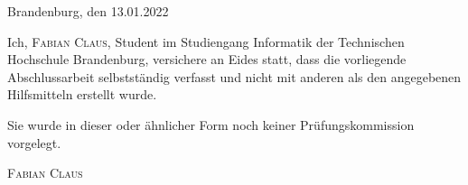 \thispagestyle{empty}

\large
\begin{flushright}
  Brandenburg, den 13.01.2022
\end{flushright}

\vspace*{50mm}
Ich, {\scshape Fabian Claus}, Student im Studiengang Informatik der
Technischen Hochschule Brandenburg, versichere an Eides statt, dass die vorliegende
Abschlussarbeit selbstständig verfasst und nicht mit anderen als den
angegebenen Hilfsmitteln erstellt wurde.

Sie wurde in dieser oder ähnlicher Form noch keiner Prüfungskommission
vorgelegt.\\

\vspace*{50mm}

\begin{flushright}
  {\scshape Fabian Claus}
\end{flushright}

\normalsize